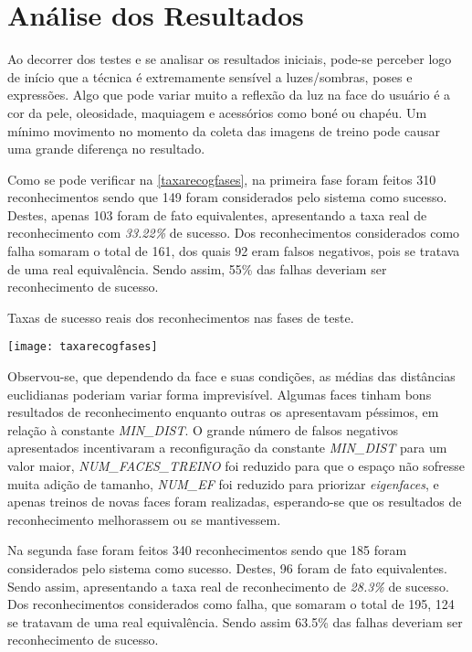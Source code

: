 \section{Análise dos Resultados}\label{ch:analresult}

Ao decorrer dos testes e se analisar os resultados iniciais, pode-se perceber logo de início que a técnica é extremamente sensível a luzes/sombras, poses e expressões. Algo que pode variar muito a reflexão da luz na face do usuário é a cor da pele, oleosidade, maquiagem e acessórios como boné ou chapéu. Um mínimo movimento no momento da coleta das imagens de treino pode causar uma grande diferença no resultado.

Como se pode verificar na \autoref{taxarecogfases}, na primeira fase foram feitos 310 reconhecimentos sendo que 149 foram considerados pelo sistema como sucesso. Destes, apenas 103 foram de fato equivalentes, apresentando a taxa real de reconhecimento com \textit{33.22\%} de sucesso. Dos reconhecimentos considerados como falha somaram o total de 161, dos quais 92 eram falsos negativos, pois se tratava de uma real equivalência. Sendo assim, 55\% das falhas deveriam ser reconhecimento de sucesso. 

\begin{table}[h]
	\centering
	\caption{Taxas de sucesso reais dos reconhecimentos nas fases de teste.}
	\texttt{[image: taxarecogfases]}
	\label{taxarecogfases}
\end{table}

Observou-se, que dependendo da face e suas condições, as médias das distâncias euclidianas poderiam variar forma imprevisível. Algumas faces tinham bons resultados de reconhecimento enquanto outras os apresentavam péssimos, em relação à constante \textit{MIN\_DIST}. O grande número de falsos negativos apresentados incentivaram a reconfiguração da constante \textit{MIN\_DIST} para um valor maior, \textit{NUM\_FACES\_TREINO} foi reduzido para que o espaço não sofresse muita adição de tamanho, \textit{NUM\_EF} foi reduzido para priorizar \textit{eigenfaces}, e apenas treinos de novas faces foram realizadas, esperando-se que os resultados de reconhecimento melhorassem ou se mantivessem.


Na segunda fase foram feitos 340 reconhecimentos sendo que 185 foram considerados pelo sistema como sucesso. Destes, 96 foram de fato equivalentes. Sendo assim, apresentando a taxa real de reconhecimento de \textit{28.3\%} de sucesso. Dos reconhecimentos considerados como falha, que somaram o total de 195, 124 se tratavam de uma real equivalência. Sendo assim 63.5\% das falhas deveriam ser reconhecimento de sucesso.

